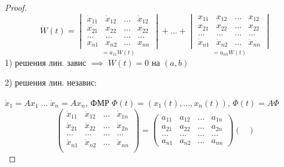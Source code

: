 \documentclass{article}
\begin{document}
\begin{proof}
  \[
    \dot{W}(t)=\underset{=a_{11}W(t)}{\begin{vmatrix}
      \dot{x}_{11} & \dot{x}_{12} & \dots & \dot{x}_{12} \\
      {x}_{21} & {x}_{22} & \dots & {x}_{22} \\
      \dots & \dots & \dots & \dots \\
      {x}_{n1} & {x}_{n2} & \dots & {x}_{nn}
    \end{vmatrix}} + \dots + \underset{=a_{nn}W(t)}{\begin{vmatrix}
      {x}_{11} & {x}_{12} & \dots & {x}_{12} \\
      {x}_{21} & {x}_{22} & \dots & {x}_{22} \\
      \dots & \dots & \dots & \dots \\
      \dot{x}_{n1} & \dot{x}_{n2} & \dots & \dot{x}_{nn}
  \end{vmatrix}}
  \]
  1) решения лин. завис $\implies \; W(t) =0$ на $(a,b)$

  2) решения лин. независ:

  $\dot{x}_1=Ax_1 \; \dots \; \dot{x}_n=Ax_n$,
  ФМР $\Phi(t)=(x_1(t),\dots,x_n(t))$, $\dot{\Phi}(t)=A\Phi$
  \[
    \begin{pmatrix}
      \dot{x}_{11} & \dot{x}_{12} & \dots & \dot{x}_{1n} \\
      \dot{x}_{21} & \dot{x}_{22} & \dots & \dot{x}_{2n} \\
      \dots & \dots & \dots & \dots \\
      \dot{x}_{n1} & \dot{x}_{n2} & \dots & \dot{x}_{nn} \\
    \end{pmatrix} = \begin{pmatrix}
      {a}_{11} & {a}_{12} & \dots & {a}_{1n} \\
      {a}_{21} & {a}_{22} & \dots & {a}_{2n} \\
      \dots & \dots & \dots & \dots \\
      {a}_{n1} & {a}_{n2} & \dots & {a}_{nn}
    \end{pmatrix} \begin{pmatrix}
      

\end{pmatrix}\]
\end{proof}
\end{document}
